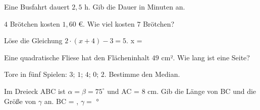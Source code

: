 \documentclass[11pt]{article}
\begin{document}
\noindent\begin{minipage}[t]{0.485\linewidth}\raggedright
\begin{aufgabe}{Eine Busfahrt dauert $2{,}5$ h. Gib die Dauer in Minuten an. \leerfeld[min]}
\end{aufgabe}
\end{minipage}\hfill\begin{minipage}[t]{0.485\linewidth}\raggedright
\begin{aufgabe}{$4$ Brötchen kosten $1{,}60$ €. Wie viel kosten $7$ Brötchen? \leerfeld[€]}
\end{aufgabe}
\end{minipage}\par

\noindent\begin{minipage}[t]{0.485\linewidth}\raggedright
\begin{aufgabe}{Löse die Gleichung $2 \cdot (x + 4) - 3 = 5$. x = \leerfeld}
\end{aufgabe}
\end{minipage}\hfill\begin{minipage}[t]{0.485\linewidth}\raggedright
\begin{aufgabe}{Eine quadratische Fliese hat den Flächeninhalt $49$ cm². Wie lang ist eine Seite? \leerfeld[cm]}
\end{aufgabe}
\end{minipage}\par

\noindent\begin{minipage}[t]{0.485\linewidth}\raggedright
\begin{aufgabe}{Tore in fünf Spielen: $3$; $1$; $4$; $0$; $2$. Bestimme den Median. \leerfeld}
\end{aufgabe}
\end{minipage}\hfill\begin{minipage}[t]{0.485\linewidth}\raggedright
\begin{aufgabe}{Im Dreieck ABC ist $\alpha = \beta = 75^\circ$ und AC = $8$ cm. Gib die Länge von BC und die Größe von $\gamma$ an. BC = \leerfeld[cm] , $\gamma =$ \leerfeld °}
\end{aufgabe}
\end{minipage}\par
\end{document}
